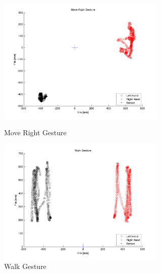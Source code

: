 \begin{figure}
\begin{minipage}
		{.45 
		\textwidth}  
		\centering
		\includegraphics[height=60mm]{figures/result/train-move-right.jpg} \caption*{Move Right Gesture} 
	\end{minipage}
	\begin{minipage}
		{.45 
		\textwidth}  
		\centering
		\includegraphics[height=60mm]{figures/result/train-walk.jpg} \caption*{Walk Gesture} 
	\end{minipage}	
\end{figure}
\label{fg:ges:plot}

